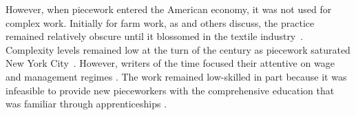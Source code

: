 \documentclass[trackingWork]{subfiles}
\begin{document}
However, when piecework entered the American economy, it was not used for complex work.
Initially for farm work, as
\citeauthor{hughRaynbirdTaskWork} and others discuss,
the practice remained relatively obscure until
it blossomed in the textile industry~\cite{hughRaynbirdTaskWork}.
Complexity levels remained low at the turn of the  century as piecework saturated New York City~\cite{riisOtherSideLives}. %
However, writers of the time focused their attentive on wage~\cite{burton1899commercial} and management regimes \cite{norton1900textile}.
The work remained low-skilled in part because it was infeasible to provide new pieceworkers with the comprehensive education that was familiar through apprenticeships \cite{hart2013rise}.
\end{document}

